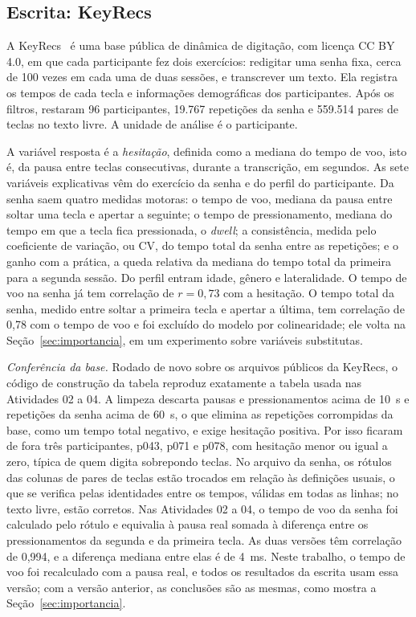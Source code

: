 \documentclass[conference]{IEEEtran}
\begin{document}
\subsection{Escrita: KeyRecs}

A KeyRecs~\cite{dias2023keyrecs,dias2023keyrecsdata} é uma base pública de
dinâmica de digitação, com licença CC BY 4.0, em que cada participante fez dois
exercícios: redigitar uma senha fixa, cerca de 100 vezes em cada uma de duas
sessões, e transcrever um texto. Ela registra os tempos de cada tecla e
informações demográficas dos participantes. Após os filtros, restaram 96
participantes, 19.767 repetições da senha e 559.514 pares de teclas no texto
livre. A unidade de análise é o participante.

A variável resposta é a \emph{hesitação}, definida como a mediana do tempo de
voo, isto é, da pausa entre teclas consecutivas, durante a transcrição, em
segundos. As sete variáveis explicativas vêm do exercício da senha e do perfil
do participante. Da senha saem quatro medidas motoras: o tempo de voo, mediana
da pausa entre soltar uma tecla e apertar a seguinte; o tempo de
pressionamento, mediana do tempo em que a tecla fica pressionada, o
\emph{dwell}; a consistência, medida pelo coeficiente de variação, ou CV, do
tempo total da senha entre as repetições; e o ganho com a prática, a queda
relativa da mediana do tempo total da primeira para a segunda sessão. Do perfil
entram idade, gênero e lateralidade. O tempo de voo na senha já tem correlação
de $r = 0,73$ com a hesitação. O tempo total da senha, medido entre soltar a
primeira tecla e apertar a última, tem correlação de 0,78 com o tempo de voo e
foi excluído do modelo por colinearidade; ele volta na
Seção~\ref{sec:importancia}, em um experimento sobre variáveis substitutas.

\emph{Conferência da base.} Rodado de novo sobre os arquivos públicos da
KeyRecs, o código de construção da tabela reproduz exatamente a tabela usada
nas Atividades 02 a 04. A limpeza descarta pausas e pressionamentos acima de
10~s e repetições da senha acima de 60~s, o que elimina as repetições
corrompidas da base, como um tempo total negativo, e exige hesitação positiva.
Por isso ficaram de fora três participantes, p043, p071 e p078, com hesitação
menor ou igual a zero, típica de quem digita sobrepondo teclas. No arquivo da
senha, os rótulos das colunas de pares de teclas estão trocados em relação às
definições usuais, o que se verifica pelas identidades entre os tempos, válidas
em todas as linhas; no texto livre, estão corretos. Nas Atividades 02 a 04, o
tempo de voo da senha foi calculado pelo rótulo e equivalia à pausa real
somada à diferença entre os pressionamentos da segunda e da primeira tecla. As
duas versões têm correlação de 0,994, e a diferença mediana entre elas é de
4~ms. Neste trabalho, o tempo de voo foi recalculado com a pausa real, e todos
os resultados da escrita usam essa versão; com a versão anterior, as
conclusões são as mesmas, como mostra a Seção~\ref{sec:importancia}.
\end{document}
